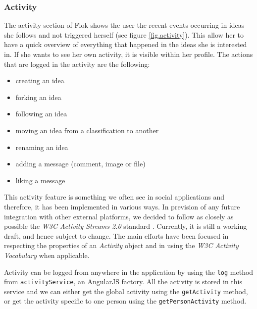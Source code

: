 \documentclass[a4paper,12pt, oneside]{article}
\begin{document}
\subsubsection{Activity}
The activity section of Flok shows the user the recent events occurring in ideas she follows and not triggered herself (see figure \ref{fig.activity}).
This allow her to have a quick overview of everything that happened in the ideas she is interested in.
If she wants to see her own activity, it is visible within her profile.
The actions that are logged in the activity are the following:
\begin{multicols}{2}
    \begin{itemize}
        \item creating an idea
        \item forking an idea
        \item following an idea
        \item moving an idea from a classification to another
        \item renaming an idea
        \item adding a message (comment, image or file)
        \item liking a message
    \end{itemize}
\end{multicols}

This activity feature is something we often see in social applications and therefore, it has been implemented in various ways.
In prevision of any future integration with other external platforms, we decided to follow as closely as possible the \emph{W3C Activity Streams 2.0} standard \cite{Snell2015AS2}.
Currently, it is still a working draft, and hence subject to change.
The main efforts have been focused in respecting the properties of an \emph{Activity} object and in using the \emph{W3C Activity Vocabulary} \cite{Snell2015AV} when applicable.

Activity can be logged from anywhere in the application by using the \texttt{log} method from \texttt{activityService}, an AngularJS factory.
All the activity is stored in this service and we can either get the global activity using the \texttt{getActivity} method, or get the activity specific to one person using the \texttt{getPersonActivity} method.
\end{document}
